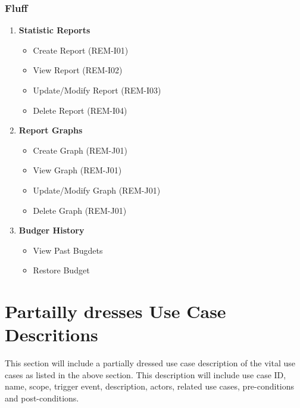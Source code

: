 \documentclass[11pt]{article}
\begin{document}
			\subsubsection{Fluff}
			\begin{enumerate}[i]
				\item \textbf{Statistic Reports}
				\begin{itemize}
					\item Create Report (REM-I01)
					\item View Report (REM-I02)
					\item Update/Modify Report (REM-I03)
					\item Delete Report (REM-I04)
				\end{itemize}
				
				\item \textbf{Report Graphs}
				\begin{itemize}
					\item Create Graph (REM-J01)
					\item View Graph (REM-J01)
					\item Update/Modify Graph (REM-J01)
					\item Delete Graph (REM-J01)
				\end{itemize}
				
				\item \textbf{Budger History}
				\begin{itemize}
					\item View Past Bugdets
					\item Restore Budget
				\end{itemize}
				
			\end{enumerate}
	
	\section{Partailly dresses Use Case Descritions}
	\begin{flushleft}
		This section will include a partially dressed use case description of the vital use cases as listed in the above section. This description will include use case ID, name, scope, trigger event, description, actors, related use cases, pre-conditions and post-conditions.
	\end{flushleft}
	
	
\end{document}
